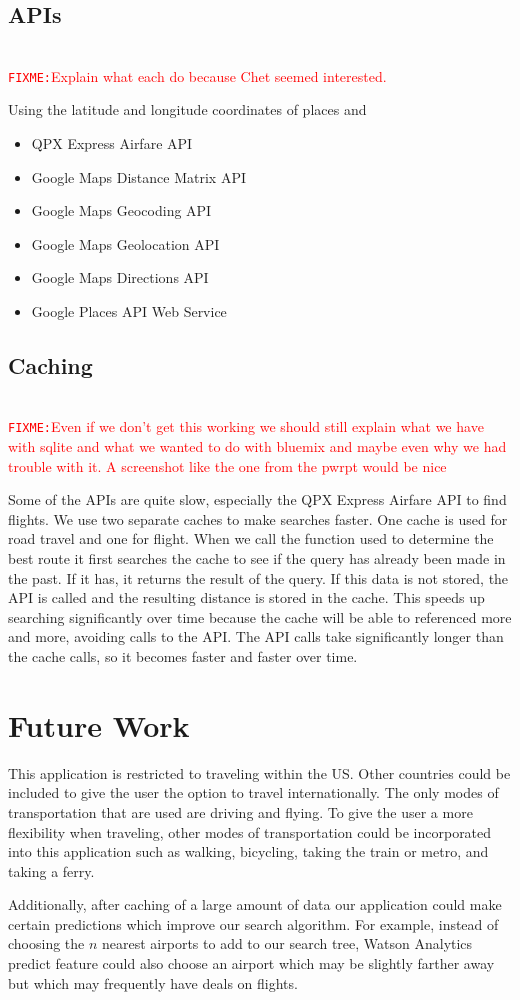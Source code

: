 \documentclass[11pt]{article}
\newcommand{\FIXME}[1]{ \ \\ \hspace* {-1.5 cm}
  \textcolor{red}{\texttt{FIXME:}#1} \medskip\par}
\begin{document}
\subsection{APIs}

\FIXME{Explain what each do because Chet seemed interested.}

Using the latitude and longitude coordinates of places and 

\begin{itemize}
\item QPX Express Airfare API
\item Google Maps Distance Matrix API
\item Google Maps Geocoding API
\item Google Maps Geolocation API
\item Google Maps Directions API
\item Google Places API Web Service
\end{itemize}

\subsection{Caching}
\FIXME{Even if we don't get this working we should still explain what we have with sqlite and what we wanted to do with bluemix and maybe even why we had trouble with it. A screenshot like the one from the pwrpt would be nice}

Some of the APIs are quite slow, especially the QPX Express Airfare API to find flights. 
We use two separate caches to make searches faster. One cache is used for road travel and one for flight. When we call the function used to determine the best route it first searches the cache to see if the query has already been made in the past. If it has, it returns the result of the query. If this data is not stored, the API is called and the resulting distance is stored in the cache. This speeds up searching significantly over time because the cache will be able to referenced more and more, avoiding calls to the API. The API calls take significantly longer than the cache calls, so it becomes faster and faster over time. 

\section{Future Work}
This application is restricted to traveling within the US. Other countries could be included to give the user the option to travel internationally. The only modes of transportation that are used are driving and flying. To give the user a more flexibility when traveling, other modes of transportation could be incorporated into this application such as walking, bicycling, taking the train or metro, and taking a ferry.

Additionally, after caching of a large amount of data our application could make certain predictions which improve our search algorithm.  For example, instead of choosing the $n$ nearest airports to add to our search tree, Watson Analytics predict feature could also choose an airport which may be slightly farther away but which may frequently have deals on flights.
				
\end{document}
